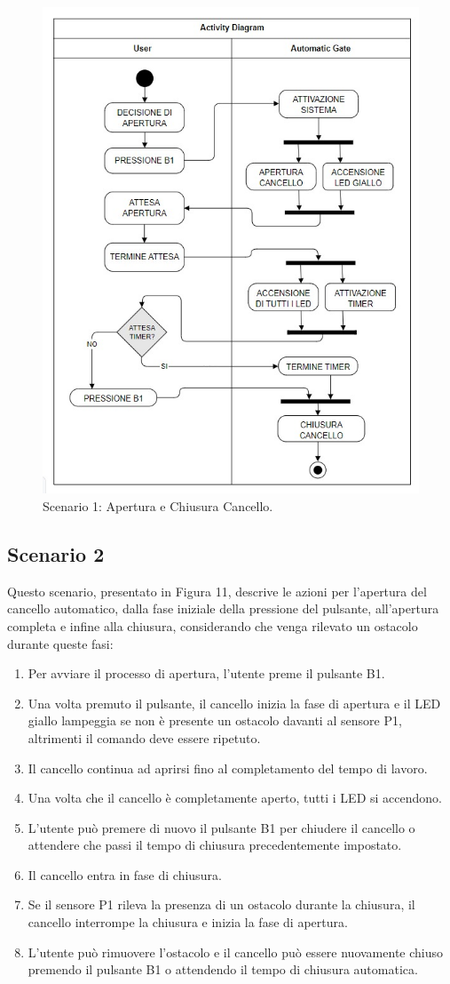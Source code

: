 \documentclass[12pt]{article}
\begin{document}
\begin{figure}[H]
    \centering
    \includegraphics[width = 0.7 \textwidth ]{Scenario_1.jpg}
    \caption{Scenario 1: Apertura e Chiusura Cancello.}
    
\end{figure}

\subsection{Scenario 2}
Questo scenario, presentato in Figura 11, descrive le azioni per l’apertura del cancello automatico, dalla fase iniziale della pressione del pulsante, all’apertura completa e infine alla chiusura, considerando che venga rilevato un ostacolo durante queste fasi:
\begin{enumerate}
    \item Per avviare il processo di apertura, l’utente preme il pulsante B1.
    \item Una volta premuto il pulsante, il cancello inizia la fase di apertura e il LED giallo lampeggia se non è presente un ostacolo davanti al sensore P1, altrimenti il comando deve essere ripetuto.
    \item Il cancello continua ad aprirsi fino al completamento del tempo di lavoro.
    \item Una volta che il cancello è completamente aperto, tutti i LED si accendono.
    \item L'utente può premere di nuovo il pulsante B1 per chiudere il cancello o attendere che passi il tempo di chiusura precedentemente impostato.
    \item Il cancello entra in fase di chiusura.
    \item Se il sensore P1 rileva la presenza di un ostacolo durante la chiusura, il cancello interrompe la chiusura e inizia la fase di apertura.
    \item L’utente può rimuovere l’ostacolo e il cancello può essere nuovamente chiuso premendo il pulsante B1 o attendendo il tempo di chiusura automatica.
\end{enumerate}
\end{document}
